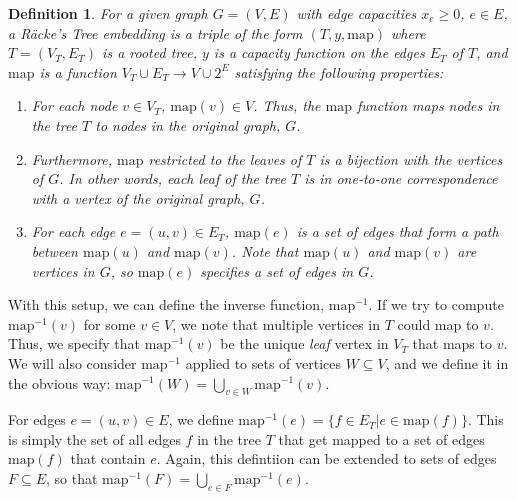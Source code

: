 \documentclass[12pt]{article}
\newtheorem{definition}{Definition}
\begin{document}
\begin{definition}
For a given graph $G = (V, E)$ with edge capacities $x_e \geq 0$, $e \in E$, a R\"{a}cke's Tree embedding is a triple of the form $(T,y,\mathrm{map})$ where $T = (V_T,E_T)$ is a rooted tree, $y$ is a capacity function on the edges $E_T$ of $T$, and $\mathrm{map}$ is a function $V_T \cup E_T \to V \cup 2^E$ satisfying the following properties:
\begin{enumerate}
\item For each node $v \in V_T$, $\mathrm{map}(v) \in V$. Thus, the $\mathrm{map}$ function maps nodes in the tree $T$ to nodes in the original graph, $G$.
\item Furthermore, $\mathrm{map}$ restricted to the leaves of $T$ is a bijection with the vertices of $G$. In other words, each leaf of the tree $T$ is in one-to-one correspondence with a vertex of the original graph, $G$.
\item For each edge $e = (u,v) \in E_T$, $\mathrm{map}(e)$ is a set of edges that form a path between $\mathrm{map}(u)$ and $\mathrm{map}(v)$. Note that $\mathrm{map}(u)$ and $\mathrm{map}(v)$ are vertices in $G$, so $\mathrm{map}(e)$ specifies a set of edges in $G$.
\end{enumerate}
\end{definition}

With this setup, we can define the inverse function, $\mathrm{map}^{-1}$. If we try to compute $\mathrm{map}^{-1}(v)$ for some $v \in V$, we note that multiple vertices in $T$ could map to $v$. Thus, we specify that $\mathrm{map}^{-1}(v)$ be the unique \emph{leaf} vertex in $V_T$ that maps to $v$. We will also consider $\mathrm{map}^{-1}$ applied to sets of vertices $W \subseteq V$, and we define it in the obvious way: $\mathrm{map}^{-1}(W) = \bigcup_{v \in W} \mathrm{map}^{-1}(v)$.

For edges $e = (u,v) \in E$, we define $\mathrm{map}^{-1}(e) = \{ f \in E_T | e \in \mathrm{map}(f)\}$. This is simply the set of all edges $f$ in the tree $T$ that get mapped to a set of edges $\mathrm{map}(f)$ that contain $e$. Again, this defintiion can be extended to sets of edges $F \subseteq E$, so that $\mathrm{map}^{-1}(F) = \bigcup_{e \in F} \mathrm{map}^{-1}(e)$.
\end{document}
